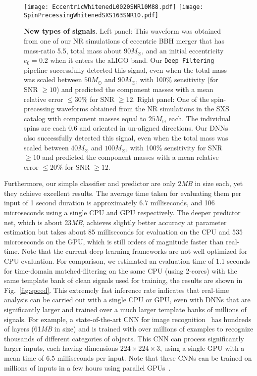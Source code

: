 \documentclass[aps,prd,%
amsmath,floats,floatfix, twocolumn, superscriptaddress,nofootinbib,showpacs]{revtex4-1}
\def\Msun{M_\odot}
\begin{document}
\begin{figure*}
	\centerline{\hspace{-.045in}
		\texttt{[image: EccentricWhitenedL0020SNR10M88.pdf]}\hspace{.5em}
		\texttt{[image: SpinPrecessingWhitenedSXS163SNR10.pdf]}
	}
	\caption{\textbf{New types of signals}. Left panel: This waveform was obtained from one of our NR simulations of eccentric BBH merger that has mass-ratio 5.5, total mass about $90\Msun$, and an initial eccentricity $e_0=0.2$ when it enters the aLIGO band. Our \texttt{Deep Filtering} pipeline successfully detected this signal, even when the total mass was scaled between $50\Msun$ and $90\Msun$, with 100\% sensitivity (for SNR $\ge 10$) and predicted the component masses with a mean relative error $\le30\%$ for SNR $\ge 12$. %
		Right panel: One of the spin-precessing waveforms obtained from the NR simulations in the SXS catalog with component masses equal to $25\Msun$ each. The individual spins are each 0.6 and oriented in un-aligned directions. Our DNNs also successfully detected this signal, even when the total mass was scaled between $40\Msun$ and $100\Msun$, with 100\% sensitivity for SNR $\ge 10$ and predicted the component masses with a mean relative error $\le20\%$ for SNR $\ge 12$. %
	}
	\label{fig:ecc_pre}
\end{figure*}

\noindent Furthermore, our simple classifier and predictor are only 2\textit{MB} in size each, yet they achieve excellent results. The average time taken for evaluating them per input of 1 second duration is approximately 6.7 milliseconds, and 106 microseconds using a single CPU and GPU respectively. The deeper predictor net, which is about 23\textit{MB}, achieves slightly better accuracy at parameter estimation but takes about 85 milliseconds for evaluation on the CPU and 535 microseconds on the GPU, which is still orders of magnitude faster than real-time. Note that the current deep learning frameworks are not well optimized for CPU evaluation. For comparison, we estimated an evaluation time of 1.1 seconds for time-domain matched-filtering on the same CPU (using 2-cores) with the same template bank of clean signals used for training, the results are shown in Fig.~\ref{fig:speed}. This extremely fast inference rate indicates that real-time analysis can be carried out with a single CPU or GPU, even with DNNs that are significantly larger and trained over a much larger template banks of millions of signals. For example, a state-of-the-art CNN for image recognition~\cite{ImageIdentify,BatchNorm} has hundreds of layers (61\textit{MB} in size) and is trained with over millions of examples to recognize thousands of different categories of objects. This CNN can process significantly larger inputs, each having dimensions $224\times224\times3$, using a single GPU with a mean time of 6.5 milliseconds per input. Note that these CNNs can be trained on millions of inputs in a few hours using parallel GPUs~\cite{FastTrain}.
\end{document}
